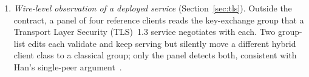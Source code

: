 \begin{enumerate}
\item \emph{Wire-level observation of a deployed service} (Section~\ref{sec:tls}). Outside the contract, a panel of four reference clients reads the key-exchange group that a Transport Layer Security (TLS)~1.3 service negotiates with each. Two group-list edits each validate and keep serving but silently move a different hybrid client class to a classical group; only the panel detects both, consistent with Han's single-peer argument~\cite{han}.
\end{enumerate}
